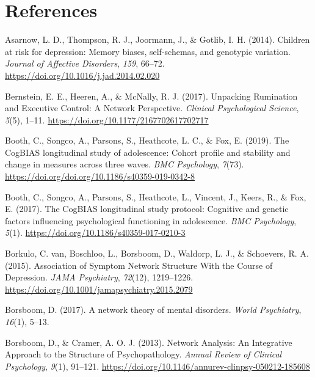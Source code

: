 \documentclass[
  english,
  man,floatsintext]{apa6}
\begin{document}
\newpage

\hypertarget{references}{%
\section{References}\label{references}}

\begingroup
\setlength{\parindent}{-0.5in}
\setlength{\leftskip}{0.5in}
\setlength{\parskip}{8pt}

\hypertarget{refs}{}
\leavevmode\hypertarget{ref-asarnow_children_2014}{}%
Asarnow, L. D., Thompson, R. J., Joormann, J., \& Gotlib, I. H. (2014). Children at risk for depression: Memory biases, self-schemas, and genotypic variation. \emph{Journal of Affective Disorders}, \emph{159}, 66--72. \url{https://doi.org/10.1016/j.jad.2014.02.020}

\leavevmode\hypertarget{ref-bernstein_unpacking_2017}{}%
Bernstein, E. E., Heeren, A., \& McNally, R. J. (2017). Unpacking Rumination and Executive Control: A Network Perspective. \emph{Clinical Psychological Science}, \emph{5}(5), 1--11. \url{https://doi.org/10.1177/2167702617702717}

\leavevmode\hypertarget{ref-booth_cogbias_2019}{}%
Booth, C., Songco, A., Parsons, S., Heathcote, L. C., \& Fox, E. (2019). The CogBIAS longitudinal study of adolescence: Cohort profile and stability and change in measures across three waves. \emph{BMC Psychology}, \emph{7}(73). \url{https://doi.org/doi.org/10.1186/s40359-019-0342-8}

\leavevmode\hypertarget{ref-booth_cogbias_2017}{}%
Booth, C., Songco, A., Parsons, S., Heathcote, L., Vincent, J., Keers, R., \& Fox, E. (2017). The CogBIAS longitudinal study protocol: Cognitive and genetic factors influencing psychological functioning in adolescence. \emph{BMC Psychology}, \emph{5}(1). \url{https://doi.org/10.1186/s40359-017-0210-3}

\leavevmode\hypertarget{ref-van_borkulo_association_2015}{}%
Borkulo, C. van, Boschloo, L., Borsboom, D., Waldorp, L. J., \& Schoevers, R. A. (2015). Association of Symptom Network Structure With the Course of Depression. \emph{JAMA Psychiatry}, \emph{72}(12), 1219--1226. \url{https://doi.org/10.1001/jamapsychiatry.2015.2079}

\leavevmode\hypertarget{ref-borsboom_network_2017}{}%
Borsboom, D. (2017). A network theory of mental disorders. \emph{World Psychiatry}, \emph{16}(1), 5--13.

\leavevmode\hypertarget{ref-borsboom_network_2013}{}%
Borsboom, D., \& Cramer, A. O. J. (2013). Network Analysis: An Integrative Approach to the Structure of Psychopathology. \emph{Annual Review of Clinical Psychology}, \emph{9}(1), 91--121. \url{https://doi.org/10.1146/annurev-clinpsy-050212-185608}
\end{document}
